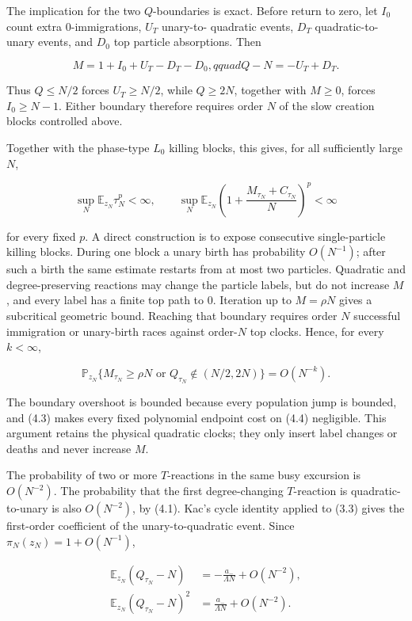 The implication for the two \(Q\)-boundaries is exact. Before return to
zero, let \(I_0\) count extra \(0\)-immigrations, \(U_T\) unary-to-
quadratic events, \(D_T\) quadratic-to-unary events, and \(D_0\) top
particle absorptions. Then

\[
 M=1+I_0+U_T-D_T-D_0,qquad Q-N=-U_T+D_T.
\]

Thus \(Q\le N/2\) forces \(U_T\ge N/2\), while \(Q\ge2N\), together with
\(M\ge0\), forces \(I_0\ge N-1\). Either boundary therefore requires
order \(N\) of the slow creation blocks controlled above.

Together with the phase-type \(L_0\) killing blocks, this gives, for all
sufficiently large \(N\),

\[
 \sup_N\mathbb E_{z_N}\tau_N^p<\infty,\qquad
 \sup_N\mathbb E_{z_N}
 \left(1+\frac{M_{\tau_N}+C_{\tau_N}}N\right)^p<\infty
                                                               \tag{4.3}
\]

for every fixed \(p\). A direct construction is to expose consecutive
single-particle killing blocks. During one block a unary birth has
probability \(O(N^{-1})\); after such a birth the same estimate restarts
from at most two particles. Quadratic and degree-preserving reactions
may change the particle labels, but do not increase \(M\), and every
label has a finite top path to \(0\). Iteration up to \(M=\rho N\) gives
a subcritical geometric bound. Reaching that boundary requires order
\(N\) successful immigration or unary-birth races against order-\(N\)
top clocks. Hence, for every \(k<\infty\),

\[
 \mathbb P_{z_N}\{M_{\tau_N}\geq\rho N
                 \text{ or }Q_{\tau_N}\notin(N/2,2N)\}
 =O(N^{-k}).                                         \tag{4.4}
\]

The boundary overshoot is bounded because every population jump is
bounded, and (4.3) makes every fixed polynomial endpoint cost on (4.4)
negligible. This argument retains the physical quadratic clocks; they
only insert label changes or deaths and never increase \(M\).

The probability of two or more \(T\)-reactions in the same busy
excursion is \(O(N^{-2})\). The probability that the first
degree-changing \(T\)-reaction is quadratic-to-unary is also
\(O(N^{-2})\), by (4.1). Kac's cycle identity applied to (3.3) gives the
first-order coefficient of the unary-to-quadratic event. Since
\(\pi_N(z_N)=1+O(N^{-1})\),

\[
 \begin{aligned}
 \mathbb E_{z_N}(Q_{\tau_N}-N)
   &=-\frac{a_-}{\Lambda N}+O(N^{-2}),\\
 \mathbb E_{z_N}(Q_{\tau_N}-N)^2
   &= \frac{a_-}{\Lambda N}+O(N^{-2}).
\end{aligned}\tag{4.5}
\]

